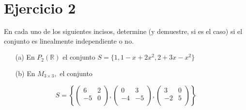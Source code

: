 \section*{Ejercicio 2}

En cada uno de los siguientes incisos, determine (y demuestre, si es el caso) si el conjunto es linealmente
independiente o no.

\begin{itemize}
    \item[(a)] En $P_{2}(\mathbb{R})$ el conjunto $S = \{ 1, 1 - x + 2x^{2}, 2 + 3x - x^{2} \}$
    \item[(b)] En $ M_{3 \times 3},$ el conjunto
\end{itemize}

\begin{equation}
    S = \left\{
        \begin{pmatrix}
            6 & 2 \\
            -5 & 0 \\
        \end{pmatrix},         
        \begin{pmatrix}
            0 & 3 \\
            -4 & -5 \\
        \end{pmatrix},        
        \begin{pmatrix}
            3 & 0 \\
            -2 & 5 \\
        \end{pmatrix}
        \right\}
\end{equation}